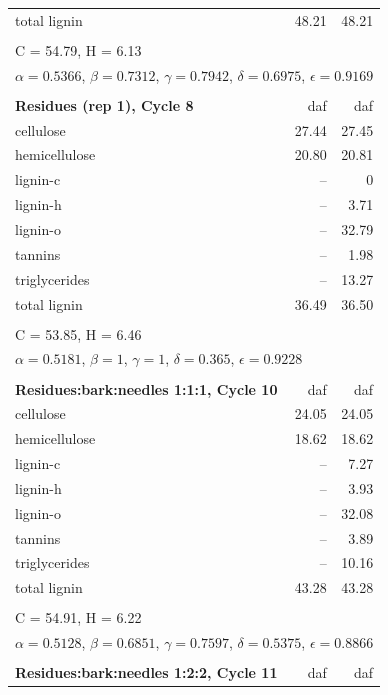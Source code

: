 \documentclass[12pt,titlepage]{article}
\begin{document}
\begin{longtable}{p{8cm}rr}
    total lignin  & 48.21 & 48.21 \\
    \\
    \multicolumn{3}{l}{C = 54.79, H = 6.13} \\
    \multicolumn{3}{l}{$\alpha = 0.5366$, $\beta = 0.7312$, $\gamma = 0.7942$, $\delta = 0.6975$, $\epsilon = 0.9169$} \\
    \\
    \textbf{Residues (rep 1), Cycle 8} & daf & daf \\
    \midrule
    cellulose     & 27.44 & 27.45 \\
    hemicellulose & 20.80 & 20.81 \\
    lignin-c      & --    & 0 \\
    lignin-h      & --    & 3.71 \\
    lignin-o      & --    & 32.79 \\
    tannins       & --    & 1.98 \\
    triglycerides & --    & 13.27 \\
    total lignin  & 36.49 & 36.50 \\
    \\
    \multicolumn{3}{l}{C = 53.85, H = 6.46} \\
    \multicolumn{3}{l}{$\alpha = 0.5181$, $\beta = 1$, $\gamma = 1$, $\delta = 0.365$, $\epsilon = 0.9228$} \\
    \\
    \textbf{Residues:bark:needles 1:1:1, Cycle 10} & daf & daf \\
    \midrule
    cellulose     & 24.05 & 24.05 \\
    hemicellulose & 18.62 & 18.62 \\
    lignin-c      & --    & 7.27 \\
    lignin-h      & --    & 3.93 \\
    lignin-o      & --    & 32.08 \\
    tannins       & --    & 3.89 \\
    triglycerides & --    & 10.16 \\
    total lignin  & 43.28 & 43.28 \\
    \\
    \multicolumn{3}{l}{C = 54.91, H = 6.22} \\
    \multicolumn{3}{l}{$\alpha = 0.5128$, $\beta = 0.6851$, $\gamma = 0.7597$, $\delta = 0.5375$, $\epsilon = 0.8866$} \\
    \\
    \textbf{Residues:bark:needles 1:2:2, Cycle 11} & daf & daf \\

\end{longtable}
\end{document}
